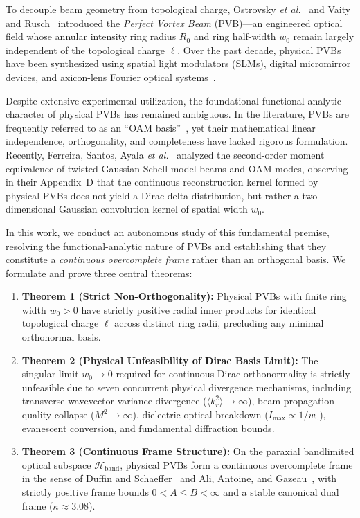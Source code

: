 \documentclass{optica-article}
\begin{document}
To decouple beam geometry from topological charge, Ostrovsky \emph{et al.}~\cite{Ostrovsky2013} and Vaity and Rusch~\cite{Vaity2015} introduced the \emph{Perfect Vortex Beam} (PVB)---an engineered optical field whose annular intensity ring radius $R_0$ and ring half-width $w_0$ remain largely independent of the topological charge $\ell$. Over the past decade, physical PVBs have been synthesized using spatial light modulators (SLMs), digital micromirror devices, and axicon-lens Fourier optical systems~\cite{Arrizon2007,Chen2013,Reddy2016}.

Despite extensive experimental utilization, the foundational functional-analytic character of physical PVBs has remained ambiguous. In the literature, PVBs are frequently referred to as an ``OAM basis''~\cite{GarciaEscartin2008}, yet their mathematical linear independence, orthogonality, and completeness have lacked rigorous formulation. Recently, Ferreira, Santos, Ayala \emph{et al.}~\cite{Ferreira2026} analyzed the second-order moment equivalence of twisted Gaussian Schell-model beams and OAM modes, observing in their Appendix~D that the continuous reconstruction kernel formed by physical PVBs does not yield a Dirac delta distribution, but rather a two-dimensional Gaussian convolution kernel of spatial width $w_0$.

In this work, we conduct an autonomous study of this fundamental premise, resolving the functional-analytic nature of PVBs and establishing that they constitute a \emph{continuous overcomplete frame} rather than an orthogonal basis. We formulate and prove three central theorems:
\begin{enumerate}
    \item \textbf{Theorem 1 (Strict Non-Orthogonality):} Physical PVBs with finite ring width $w_0 > 0$ have strictly positive radial inner products for identical topological charge $\ell$ across distinct ring radii, precluding any minimal orthonormal basis.
    \item \textbf{Theorem 2 (Physical Unfeasibility of Dirac Basis Limit):} The singular limit $w_0 \to 0$ required for continuous Dirac orthonormality is strictly unfeasible due to seven concurrent physical divergence mechanisms, including transverse wavevector variance divergence ($\langle k_r^2 \rangle \to \infty$), beam propagation quality collapse ($M^2 \to \infty$), dielectric optical breakdown ($I_{\max} \propto 1/w_0$), evanescent conversion, and fundamental diffraction bounds.
    \item \textbf{Theorem 3 (Continuous Frame Structure):} On the paraxial bandlimited optical subspace $\mathcal{H}_{\text{band}}$, physical PVBs form a continuous overcomplete frame in the sense of Duffin and Schaeffer~\cite{Duffin1952} and Ali, Antoine, and Gazeau~\cite{Ali1993}, with strictly positive frame bounds $0 < A \le B < \infty$ and a stable canonical dual frame ($\kappa \approx 3.08$).
\end{enumerate}
\end{document}
